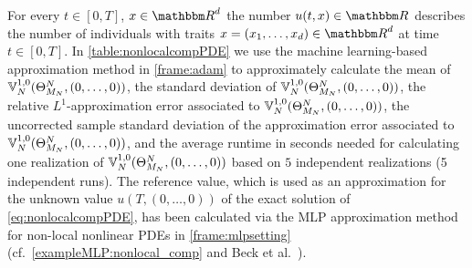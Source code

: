 For every $t\in[0,T]$, $x\in\R^d$ the number $u(t,x) \in \R$ describes the number of individuals with traits $x = (x_1, \dots, x_d) \in \R^d$ at time $t \in [0,T]$.
In \cref{table:nonlocalcompPDE}
we use the machine learning-based approximation method
in \cref{frame:adam}
to approximately calculate
the mean of %
$
{\mathbb{V}}^{1,0}_N(\Theta^N_{M_N},(0,\ldots,0))
$,
the standard deviation of %
$
{\mathbb{V}}^{1,0}_N(\Theta^N_{M_N},(0,\ldots,0))
$,
the relative $ L^1 $-approximation error associated to %
$
{\mathbb{V}}^{1,0}_N(\Theta^N_{M_N},(0,\ldots,0))
$,
the uncorrected sample standard deviation of the approximation error associated to %
$
{\mathbb{V}}^{1,0}_N(\Theta^N_{M_N},(0,\ldots,0))
$,
and the average runtime in seconds needed for calculating one realization of $
{\mathbb{V}}^{1,0}_N(\Theta^N_{M_N},(0,\ldots,0))
$
%
based on $5$ independent realizations (5 independent runs).
%
The reference value, which is used as an approximation for the unknown value $u(T,(0,\ldots,0))$ of the exact solution of \eqref{eq:nonlocalcompPDE},  has been calculated via the MLP approximation method for non-local nonlinear PDEs in \cref{frame:mlpsetting} (cf.~\cref{exampleMLP:nonlocal_comp} and Beck et al.~\cite[Remark~3.3]{Beck2017a}).


